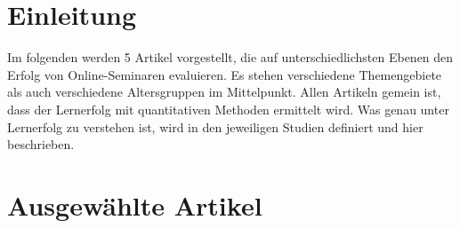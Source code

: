 \section{Einleitung}\label{einleitung}

Im folgenden werden 5 Artikel vorgestellt, die auf unterschiedlichsten
Ebenen den Erfolg von Online-Seminaren evaluieren. Es stehen
verschiedene Themengebiete als auch verschiedene Altersgruppen im
Mittelpunkt. Allen Artikeln gemein ist, dass der Lernerfolg mit
quantitativen Methoden ermittelt wird. Was genau unter Lernerfolg zu
verstehen ist, wird in den jeweiligen Studien definiert und hier
beschrieben.

\section{Ausgewählte Artikel}\label{ausgewuxe4hlte-artikel}

\textbf{}


\parencite{Stocker2009}


